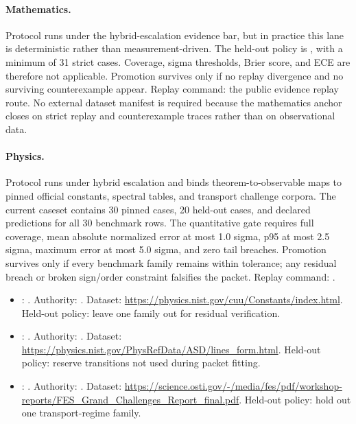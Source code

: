 \paragraph{Mathematics.}
Protocol  runs under the
hybrid-escalation evidence bar, but in practice this lane is deterministic
rather than measurement-driven. The held-out policy is
, with a minimum of 31
strict cases. Coverage, sigma thresholds, Brier score, and ECE are therefore
not applicable. Promotion survives only if no replay divergence and no
surviving counterexample appear. Replay command:
the public evidence replay route. No
external dataset manifest is required because the mathematics anchor closes on
strict replay and counterexample traces rather than on observational data.

\paragraph{Physics.}
Protocol  runs
under hybrid escalation and binds theorem-to-observable maps to pinned official
constants, spectral tables, and transport challenge corpora. The current
caseset contains 30 pinned cases, 20 held-out cases, and declared predictions
for all 30 benchmark rows. The quantitative gate requires full coverage, mean
absolute normalized error at most 1.0 sigma, p95 at most 2.5 sigma, maximum
error at most 5.0 sigma, and zero tail breaches. Promotion survives only if
every benchmark family remains within tolerance; any residual breach or broken
sign/order constraint falsifies the packet. Replay command:
.
\begin{itemize}[leftmargin=1.5em,nosep]
\item {}: . Authority: . Dataset: \url{https://physics.nist.gov/cuu/Constants/index.html}. Held-out policy: leave one family out for residual verification.
\item {}: . Authority: . Dataset: \url{https://physics.nist.gov/PhysRefData/ASD/lines_form.html}. Held-out policy: reserve transitions not used during packet fitting.
\item {}: . Authority: . Dataset: \url{https://science.osti.gov/-/media/fes/pdf/workshop-reports/FES_Grand_Challenges_Report_final.pdf}. Held-out policy: hold out one transport-regime family.
\end{itemize}

